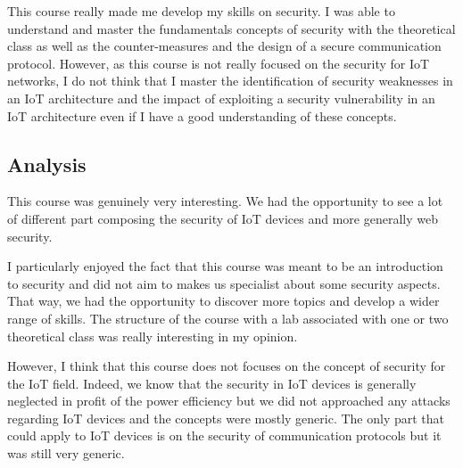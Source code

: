 This course really made me develop my skills on security. I was able to understand and master the fundamentals concepts of security with the theoretical class as well as the counter-measures and the design of a secure communication protocol. However, as this course is not really focused on the security for IoT networks, I do not think that I master the identification of security weaknesses in an IoT architecture and the impact of exploiting a security vulnerability in an IoT architecture even if I have a good understanding of these concepts.

\subsection{Analysis}

This course was genuinely very interesting. We had the opportunity to see a lot of different part composing the security of IoT devices and more generally web security.
\\\par
I particularly enjoyed the fact that this course was meant to be an introduction to security and did not aim to makes us specialist about some security aspects. That way, we had the opportunity to discover more topics and develop a wider range of skills. The structure of the course with a lab associated with one or two theoretical class was really interesting in my opinion.  

However, I think that this course does not focuses on the concept of security for the IoT field. Indeed, we know that the security in IoT devices is generally neglected in profit of the power efficiency but we did not approached any attacks regarding IoT devices and the concepts were mostly generic. The only part that could apply to IoT devices is on the security of communication protocols but it was still very generic. 